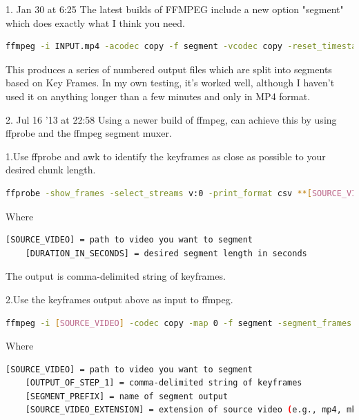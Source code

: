 \documentclass[letter,11pt,onecolumn]{book}
\begin{document}
1. Jan 30 at 6:25
The latest builds of FFMPEG include a new option "segment" which does exactly what I think you need.
\begin{lstlisting}[language=bash]
ffmpeg -i INPUT.mp4 -acodec copy -f segment -vcodec copy -reset_timestamps 1 -map 0 OUTPUT%d.mp4
\end{lstlisting}
This produces a series of numbered output files which are split into segments based on Key Frames. In my own testing, it's worked well, although I haven't used it on anything longer than a few minutes and only in MP4 format.



2. Jul 16 '13 at 22:58
Using a newer build of ffmpeg, can achieve this by using ffprobe and the ffmpeg segment muxer.

1.Use ffprobe and awk to identify the keyframes as close as possible to your desired chunk length.
\begin{lstlisting}[language=bash]
ffprobe -show_frames -select_streams v:0 -print_format csv **[SOURCE_VIDEO]** 2>&1 | grep -n frame,video,1 | awk 'BEGIN { FS="," } { print $1 " " $5 }' | sed 's/:frame//g' | awk 'BEGIN { previous=0; frameIdx=0; size=0; } { split($2,time,"."); current=time[1]; if (current-previous >= **[DURATION_IN_SECONDS]**){ a[frameIdx]=$1; frameIdx++; size++; previous=current;} } END { str=a[0]; for(i=1;i<size;i++) { str = str "," a[i]; } print str;}'
\end{lstlisting}
Where
\begin{lstlisting}[language=bash]
    [SOURCE_VIDEO] = path to video you want to segment
    [DURATION_IN_SECONDS] = desired segment length in seconds
\end{lstlisting}
The output is comma-delimited string of keyframes.

2.Use the keyframes output above as input to ffmpeg.
\begin{lstlisting}[language=bash]
ffmpeg -i [SOURCE_VIDEO] -codec copy -map 0 -f segment -segment_frames [OUTPUT_OF_STEP_1] [SEGMENT_PREFIX] _%03d.[SOURCE_VIDEO_EXTENSION]
\end{lstlisting}
Where
\begin{lstlisting}[language=bash]
    [SOURCE_VIDEO] = path to video you want to segment
    [OUTPUT_OF_STEP_1] = comma-delimited string of keyframes
    [SEGMENT_PREFIX] = name of segment output
    [SOURCE_VIDEO_EXTENSION] = extension of source video (e.g., mp4, mkv)
\end{lstlisting}
\end{document}

